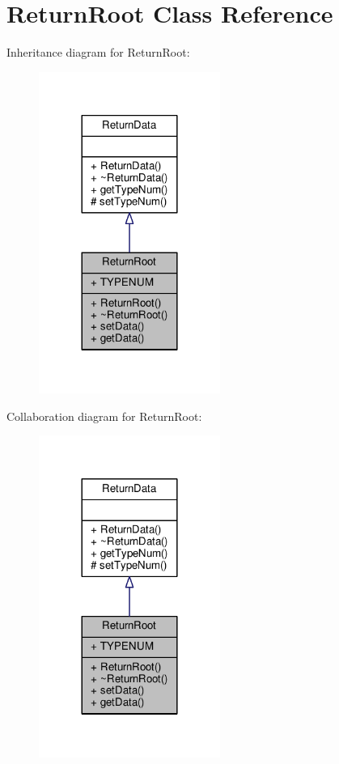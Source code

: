 \hypertarget{classReturnRoot}{}\section{Return\+Root Class Reference}
\label{classReturnRoot}


Inheritance diagram for Return\+Root\+:
\nopagebreak
\begin{figure}[H]
\begin{center}
\leavevmode
\includegraphics[width=168pt]{classReturnRoot__inherit__graph}
\end{center}
\end{figure}


Collaboration diagram for Return\+Root\+:
\nopagebreak
\begin{figure}[H]
\begin{center}
\leavevmode
\includegraphics[width=168pt]{classReturnRoot__coll__graph}
\end{center}
\end{figure}
